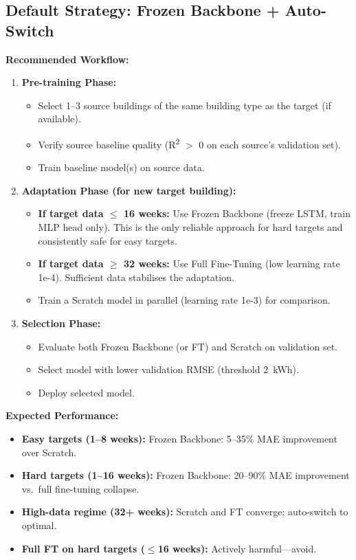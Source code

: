 \documentclass[12pt,a4paper]{report}
\begin{document}
\subsection{Default Strategy: Frozen Backbone + Auto-Switch}

\textbf{Recommended Workflow:}

\begin{enumerate}
    \item \textbf{Pre-training Phase:}
    \begin{itemize}
        \item Select 1--3 source buildings of the same building type as the target (if available).
        \item Verify source baseline quality (R\textsuperscript{2} $>$ 0 on each source's validation set).
        \item Train baseline model(s) on source data.
    \end{itemize}
    
    \item \textbf{Adaptation Phase (for new target building):}
    \begin{itemize}
        \item \textbf{If target data $\leq$ 16 weeks:} Use Frozen Backbone (freeze LSTM, train MLP head only). This is the only reliable approach for hard targets and consistently safe for easy targets.
        \item \textbf{If target data $\geq$ 32 weeks:} Use Full Fine-Tuning (low learning rate 1e-4). Sufficient data stabilises the adaptation.
        \item Train a Scratch model in parallel (learning rate 1e-3) for comparison.
    \end{itemize}
    
    \item \textbf{Selection Phase:}
    \begin{itemize}
        \item Evaluate both Frozen Backbone (or FT) and Scratch on validation set.
        \item Select model with lower validation RMSE (threshold 2~kWh).
        \item Deploy selected model.
    \end{itemize}
\end{enumerate}

\textbf{Expected Performance:}
\begin{itemize}
    \item \textbf{Easy targets (1--8 weeks):} Frozen Backbone: 5--35\% MAE improvement over Scratch.
    \item \textbf{Hard targets (1--16 weeks):} Frozen Backbone: 20--90\% MAE improvement vs.\ full fine-tuning collapse.
    \item \textbf{High-data regime (32+ weeks):} Scratch and FT converge; auto-switch to optimal.
    \item \textbf{Full FT on hard targets ($\leq$16 weeks):} Actively harmful---avoid.
\end{itemize}
\end{document}
